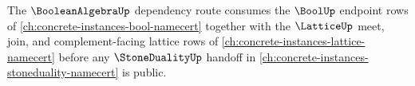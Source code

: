 The $\BooleanAlgebraUp$ dependency route consumes the $\BoolUp$ endpoint rows of \autoref{ch:concrete-instances-bool-namecert} together with the $\LatticeUp$ meet, join, and complement-facing lattice rows of \autoref{ch:concrete-instances-lattice-namecert} before any $\StoneDualityUp$ handoff in \autoref{ch:concrete-instances-stoneduality-namecert} is public.

